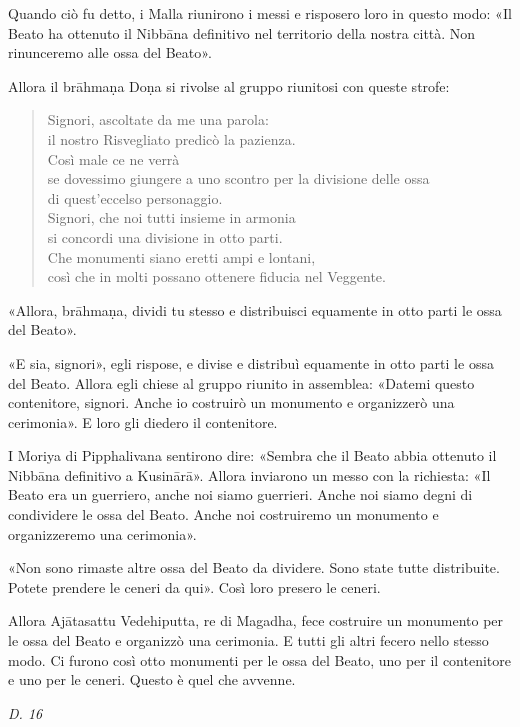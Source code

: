 Quando ciò fu detto, i Malla riunirono i messi e risposero loro in
questo modo: «Il Beato ha ottenuto il Nibbāna definitivo nel territorio
della nostra città. Non rinunceremo alle ossa del Beato».


Allora il brāhmaṇa Doṇa si rivolse al gruppo riunitosi con queste
strofe:


\begin{quotation}
Signori, ascoltate da me una parola: \\
il nostro Risvegliato predicò la pazienza. \\
Così male ce ne verrà \\
se dovessimo giungere a uno scontro per la divisione delle ossa \\
di quest’eccelso personaggio. \\
Signori, che noi tutti insieme in armonia \\
si concordi una divisione in otto parti. \\
Che monumenti siano eretti ampi e lontani, \\
così che in molti possano ottenere fiducia nel Veggente.
\end{quotation}

«Allora, brāhmaṇa, dividi tu stesso e distribuisci equamente in otto
parti le ossa del Beato».


«E sia, signori», egli rispose, e divise e distribuì equamente in otto
parti le ossa del Beato. Allora egli chiese al gruppo riunito in
assemblea: «Datemi questo contenitore, signori. Anche io costruirò un
monumento e organizzerò una cerimonia». E loro gli diedero il
contenitore.


I Moriya di Pipphalivana sentirono dire: «Sembra che il Beato abbia
ottenuto il Nibbāna definitivo a Kusinārā». Allora inviarono un messo
con la richiesta: «Il Beato era un guerriero, anche noi siamo guerrieri.
Anche noi siamo degni di condividere le ossa del Beato. Anche noi
costruiremo un monumento e organizzeremo una cerimonia».


«Non sono rimaste altre ossa del Beato da dividere. Sono state tutte
distribuite. Potete prendere le ceneri da qui». Così loro presero le
ceneri.


Allora Ajātasattu Vedehiputta, re di Magadha, fece costruire un
monumento per le ossa del Beato e organizzò una cerimonia. E tutti gli
altri fecero nello stesso modo. Ci furono così otto monumenti per le
ossa del Beato, uno per il contenitore e uno per le ceneri. Questo è
quel che avvenne.


\emph{D. 16}


